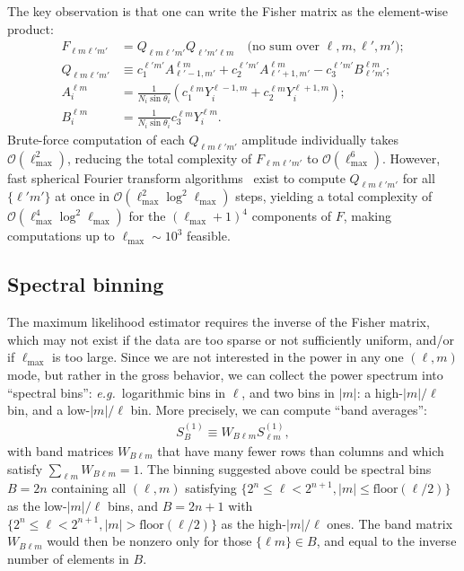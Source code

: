 \documentclass[prd,aps,twocolumn,nofootinbib,superscriptaddress,preprintnumbers,balancelastpage,longbibliography,floatfix]{revtex4-1}
\begin{document}
The key observation is that one can write the Fisher matrix as the element-wise product:
\begin{align}
F_{\ell m \ell' m'} &= Q_{\ell m \ell' m'} Q_{\ell' m' \ell m} \quad \text{(no sum over $\ell, m, \ell', m'$)}; \nonumber\\
Q_{\ell m \ell' m'} &\equiv c^{\ell' m'}_1 A^{\ell m}_{\ell'-1,m'} + c^{\ell' m'}_2 A^{\ell m}_{\ell'+1,m'} - c^{\ell' m'}_3 B^{\ell m}_{\ell' m'}; \nonumber\\ 
A^{\ell m}_i &= \frac{1}{N_i \sin \theta_i} \left( c^{\ell m}_1 Y^{\ell-1,m}_i + c^{\ell m}_2 Y^{\ell+1,m}_i \right); \nonumber\\ 
B^{\ell m}_i &= \frac{1}{N_i \sin \theta_i} c^{\ell m}_3 Y^{\ell m}_i.
\end{align}
Brute-force computation of each $Q_{\ell m \ell' m'}$ amplitude individually takes $\mathcal{O}(\ell_\mathrm{max}^2)$, reducing the total complexity of $F_{\ell m \ell' m'}$ to $\mathcal{O}(\ell_\mathrm{max}^6)$. However, fast spherical Fourier transform algorithms~\cite{2013GGG....14..751S,2013A&A...554A.112R,doi:10.1029/2018GC007529} exist to compute $Q_{\ell m \ell' m'}$ for all $\lbrace \ell' m'\rbrace$ at once in $\mathcal{O}(\ell_\mathrm{max}^2 \log^2 \ell_\mathrm{max})$ steps, yielding a total complexity of $\mathcal{O}(\ell_\mathrm{max}^4 \log^2 \ell_\mathrm{max})$ for the $(\ell_\mathrm{max} + 1)^4$ components of $F$, making computations up to $\ell_\mathrm{max} \sim 10^3$ feasible. 

\subsection{Spectral binning}\label{app:specbin}
The maximum likelihood estimator requires the inverse of the Fisher matrix, which may not exist if the data are too sparse or not sufficiently uniform, and/or if $\ell_\text{max}$ is too large. Since we are not interested in the power in any one $(\ell,m)$ mode, but rather in the gross behavior, we can collect the power spectrum into ``spectral bins'': \emph{e.g.}~logarithmic bins in $\ell$, and two bins in $|m|$: a high-$|m|/\ell$ bin, and a low-$|m|/\ell$ bin. More precisely, we can compute ``band averages'':
\begin{align}
S^{(1)}_B \equiv  W_{B \ell m} S^{(1)}_{\ell m}, \label{eq:Sbinned}
\end{align}
with band matrices $W_{B \ell m}$ that have many fewer rows than columns and which satisfy $\sum_{\ell m} W_{B \ell m} = 1$. The binning suggested above could be spectral bins $B = 2n$ containing all $(\ell,m)$ satisfying $\lbrace 2^n \le \ell < 2^{n+1}, |m|\le\text{floor}(\ell/2)\rbrace$ as the low-$|m|/\ell$ bins, and $B = 2n+1$ with $\lbrace 2^n \le \ell < 2^{n+1}, |m|>\text{floor}(\ell/2)\rbrace$ as the high-$|m|/\ell$ ones. The band matrix $W_{B \ell m}$ would then be nonzero only for those $\{\ell m\} \in B$, and equal to the inverse number of elements in $B$.
\end{document}
